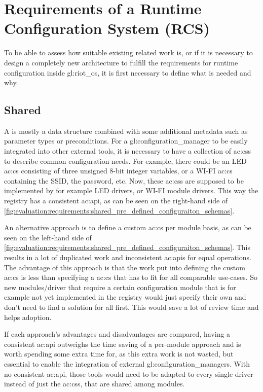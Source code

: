 \chapter{Requirements of a Runtime Configuration System (RCS)}
\label{chapter:requirements}

To be able to assess how suitable existing related work is, or if it is necessary to design a completely new architecture to fulfill the requirements for runtime configuration inside \gls{gl:riot_os}, it is first necessary to define what is needed and why.

\section{Shared }
\label{sec:requirements:shared_pre_defined_configuraiton_schemas}

A  is mostly a data structure combined with some additional metadata such as parameter types or preconditions.
For a \gls{gl:configuration_manager} to be easily integrated into other external tools, it is necessary to have a collection of \glspl{ac:cs} to describe common configuration needs.
For example, there could be an LED \gls{ac:cs} consisting of three unsigned 8-bit integer variables, or a WI-FI \gls{ac:cs} containing the SSID, the password, etc.
Now, these \glspl{ac:cs} are supposed to be implemented by for example LED drivers, or WI-FI module drivers.
This way the registry has a consistent \gls{ac:api}, as can be seen on the right-hand side of \autoref{fig:evaluation:requirements:shared_pre_defined_configuraiton_schemas}.

An alternative approach is to define a custom \gls{ac:cs} per module basis, as can be seen on the left-hand side of \autoref{fig:evaluation:requirements:shared_pre_defined_configuraiton_schemas}.
This results in a lot of duplicated work and inconsistent \glspl{ac:api} for equal operations.
The advantage of this approach is that the work put into defining the custom \gls{ac:cs} is less than specifying a \gls{ac:cs} that has to fit for all comparable use-cases.
So new modules/driver that require a certain configuration module that is for example not yet implemented in the registry would just specify their own and don't need to find a solution for all first.
This would save a lot of review time and helps adoption.

If each approach's advantages and disadvantages are compared, having a consistent \gls{ac:api} outweighs the time saving of a per-module approach and is worth spending some extra time for, as this extra work is not wasted, but essential to enable the integration of external \glspl{gl:configuration_manager}. With no consistent \gls{ac:api}, those tools would need to be adapted to every single driver instead of just the \glspl{ac:cs}, that are shared among modules.

